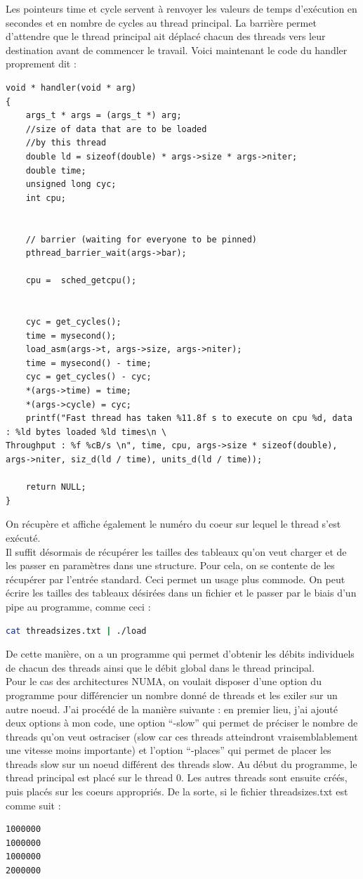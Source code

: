\documentclass{report}
\begin{document}
Les pointeurs time et cycle servent à renvoyer les valeurs de temps d'exécution en secondes et en 
nombre de cycles au thread principal. La barrière permet d'attendre que le thread principal ait déplacé
chacun des threads vers leur destination avant de commencer le travail. Voici maintenant le code du 
handler proprement dit : 
\begin{lstlisting}
void * handler(void * arg)
{
	args_t * args = (args_t *) arg;
	//size of data that are to be loaded 
	//by this thread
	double ld = sizeof(double) * args->size * args->niter;
	double time;
	unsigned long cyc; 
	int cpu;


	// barrier (waiting for everyone to be pinned)
	pthread_barrier_wait(args->bar);

	cpu =  sched_getcpu();


	cyc = get_cycles();
	time = mysecond();
	load_asm(args->t, args->size, args->niter);
	time = mysecond() - time;
	cyc = get_cycles() - cyc;
	*(args->time) = time;
	*(args->cycle) = cyc;
	printf("Fast thread has taken %11.8f s to execute on cpu %d, data : %ld bytes loaded %ld times\n \
Throughput : %f %cB/s \n", time, cpu, args->size * sizeof(double),  args->niter, siz_d(ld / time), units_d(ld / time));

	return NULL;
}
\end{lstlisting}
On récupère et affiche également le numéro du coeur sur lequel le thread s'est exécuté.
\\Il suffit désormais de récupérer les tailles des tableaux qu'on veut charger et de les passer en 
paramètres dans une structure. Pour cela, on se contente de les récupérer par l'entrée standard. 
Ceci permet un usage plus commode. On peut écrire les tailles des tableaux désirées dans un fichier 
et le passer par le biais d'un pipe au programme, comme ceci : 

\begin{lstlisting}[language=bash]
cat threadsizes.txt | ./load 
\end{lstlisting}

De cette manière, on a un programme qui permet d'obtenir les débits individuels de chacun des threads 
ainsi que le débit global dans le thread principal.
\\Pour le cas des architectures NUMA, on voulait disposer d'une option du programme pour différencier
un nombre donné de threads et les exiler sur un autre noeud. J'ai procédé de la manière suivante :
en premier lieu, j'ai ajouté deux options à mon code, une option ``-slow'' qui permet de préciser le
nombre de threads qu'on veut ostraciser (slow car ces threads atteindront vraisemblablement une vitesse
moins importante) et l'option ``-places'' qui permet de placer les threads slow sur un noeud différent
des threads slow. Au début du programme, le thread principal est placé sur le thread 0. Les autres 
threads sont ensuite créés, puis placés sur les coeurs appropriés. De la sorte, si le fichier 
threadsizes.txt est comme suit : 
\begin{lstlisting}[language=bash]
1000000
1000000
1000000
2000000
\end{lstlisting}
\end{document}
